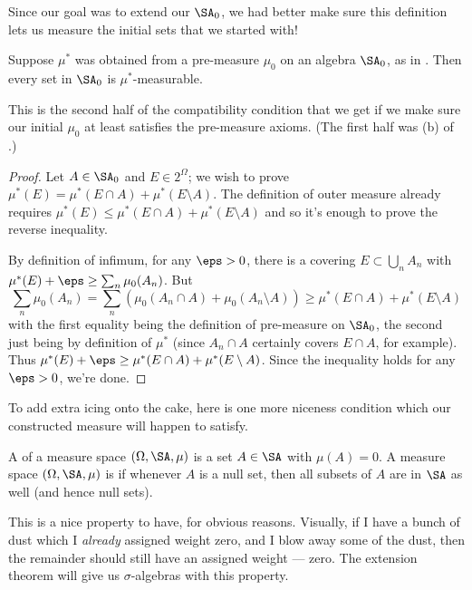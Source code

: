 Since our goal was to extend our $\SA_0$,
we had better make sure this definition
lets us measure the initial sets that we started with!
\begin{proposition}
	\label{prop:cm_compatible}
	Suppose $\mu^\ast$ was obtained from a pre-measure $\mu_0$ on
	an algebra $\SA_0$, as in .
	Then every set in $\SA_0$ is $\mu^\ast$-measurable.
\end{proposition}
This is the second half of the compatibility condition
that we get if we make sure our initial $\mu_0$
at least satisfies the pre-measure axioms.
(The first half was (b) of .)
\begin{proof}
	Let $A \in \SA_0$ and $E \in 2^{\Omega}$; we wish to prove
	$\mu^\ast(E) = \mu^\ast(E \cap A) + \mu^\ast(E \setminus A)$.
	The definition of outer measure already requires
	$\mu^\ast(E) \le \mu^\ast(E \cap A) + \mu^\ast(E \setminus A)$
	and so it's enough to prove the reverse inequality.

	By definition of infimum, for any $\eps > 0$,
	there is a covering $E \subset \bigcup_n A_n$
	with $\mu^\ast(E) + \eps \ge \sum_n \mu_0(A_n)$.
	But \[ \sum_n \mu_0(A_n)
		= \sum_n \left( \mu_0(A_n \cap A) + \mu_0(A_n \setminus A) \right)
		\ge \mu^\ast(E \cap A) + \mu^\ast(E \setminus A)  \]
	with the first equality being the definition of pre-measure
	on $\SA_0$, the second just being by definition of $\mu^\ast$
	(since $A_n \cap A$ certainly covers $E \cap A$, for example).
	Thus $\mu^\ast(E) + \eps \ge \mu^\ast(E \cap A) + \mu^\ast(E \setminus A)$.
	Since the inequality holds for any $\eps > 0$, we're done.
\end{proof}

To add extra icing onto the cake,
here is one more niceness condition
which our constructed measure will happen to satisfy.
\begin{definition}
	A  of a measure space $(\Omega, \SA, \mu)$
	is a set $A \in \SA$ with $\mu(A) = 0$.
	A measure space $(\Omega, \SA, \mu)$ is 
	if whenever $A$ is a null set,
	then all subsets of $A$ are in $\SA$ as well (and hence null sets).
\end{definition}
This is a nice property to have, for obvious reasons.
Visually, if I have a bunch of dust which I \emph{already} assigned weight zero,
and I blow away some of the dust,
then the remainder should still have an assigned weight --- zero.
The extension theorem will give us $\sigma$-algebras with this property.

